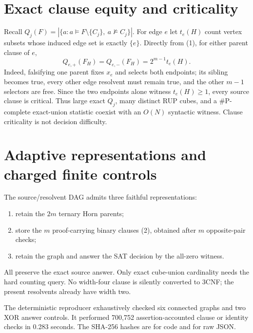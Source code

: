 \documentclass[11pt]{article}
\begin{document}
\section{Exact clause equity and criticality}
Recall
$Q_j(F)=|\{a:a\models F\setminus\{C_j\},\ a\not\models C_j\}|$.
For edge $e$ let $t_e(H)$ count vertex subsets whose induced edge set is
exactly $\{e\}$.  Directly from (1), for either parent clause of $e$,
\[
Q_{e,+}(F_H)=Q_{e,-}(F_H)=2^{m-1}t_e(H).                    \tag{5}
\]
Indeed, falsifying one parent fixes $x_e$ and selects both endpoints; its
sibling becomes true, every other edge resolvent must remain true, and the
other $m-1$ selectors are free.  Since the two endpoints alone witness
$t_e(H)\ge1$, every source clause is critical.  Thus large exact $Q_j$, many
distinct RUP cubes, and a \#P-complete exact-union statistic coexist with an
$O(N)$ syntactic witness.  Clause criticality is not decision difficulty.

\section{Adaptive representations and charged finite controls}
The source/resolvent DAG admits three faithful representations:
\begin{enumerate}
\item retain the $2m$ ternary Horn parents;
\item store the $m$ proof-carrying binary clauses (2), obtained after $m$
opposite-pair checks;
\item retain the graph and answer the SAT decision by the all-zero witness.
\end{enumerate}
All preserve the exact source answer.  Only exact cube-union cardinality needs
the hard counting query.  No width-four clause is silently converted to 3CNF;
the present resolvents already have width two.

The deterministic reproducer exhaustively checked six connected graphs and
two XOR answer controls.  It performed 700,752 assertion-accounted clause or
identity checks in 0.283 seconds.  The SHA-256 hashes are
for code and
for raw JSON.
\end{document}
